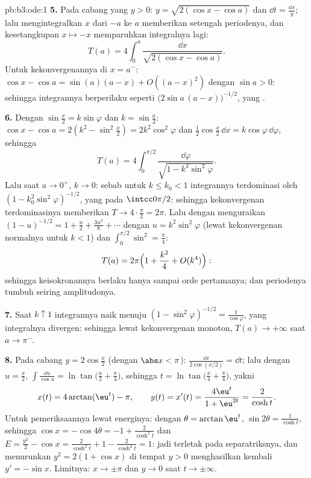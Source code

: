 \begin{solution}{pb:b3:ode:1}
\textbf{5.} Pada cabang yang $y > 0$: $y = \sqrt{2(\cos x
- \cos a)}$ dan $\dd t = \frac{\dd x}{y}$; lalu mengintegralkan $x$
dari $-a$ ke $a$ memberikan setengah periodenya, dan kesetangkupan $x
\mapsto -x$ memparuhkan integralnya lagi:
\[
T(a) = 4\int_0^a\frac{\dd x}{\sqrt{2(\cos x - \cos a)}} .
\]
Untuk kekonvergenannya di $x = a^-$: $\cos x - \cos a = \sin(a)(a - x) +
O((a-x)^2)$ dengan $\sin a > 0$: sehingga integrannya berperilaku seperti
$\bigl(2\sin a\,(a - x)\bigr)^{-1/2}$, yang .

\textbf{6.} Dengan $\sin\frac x2 = k\sin\varphi$ dan $k =
\sin\frac a2$: $\cos x - \cos a = 2(k^2 - \sin^2\frac x2)
= 2k^2\cos^2\varphi$ dan $\frac12\cos\frac x2\,\dd x =
k\cos\varphi\,\dd\varphi$, sehingga
\[
T(a) = 4\int_0^{\pi/2}
\frac{\dd\varphi}{\sqrt{1 - k^2\sin^2\varphi}} .
\]
Lalu saat $a \to 0^+$, $k \to 0$: sebab untuk $k \leq k_0 < 1$
integrannya terdominasi oleh $(1 - k_0^2\sin^2\varphi)^{-1/2}$,
yang  pada $\intcc0{\pi/2}$: sehingga kekonvergenan terdominasinya memberikan $T \to
4\cdot\frac\pi2 = 2\pi$. Lalu dengan menguraikan $(1 - u)^{-1/2} = 1 +
\frac u2 + \frac{3u^2}8 + \cdots$ dengan $u =
k^2\sin^2\varphi$ (lewat kekonvergenan normalnya untuk $k < 1$) dan
$\int_0^{\pi/2}\sin^2 = \frac\pi4$:
\[
T(a) = 2\pi\Bigl(1 + \frac{k^2}{4} + O(k^4)\Bigr) :
\]
sehingga keisokronannya berlaku hanya sampai orde pertamanya; dan periodenya tumbuh seiring
amplitudonya.

\textbf{7.} Saat $k \uparrow 1$ integrannya naik menuju $(1
- \sin^2\varphi)^{-1/2} = \frac1{\cos\varphi}$, yang
integralnya divergen: sehingga lewat kekonvergenan monoton, $T(a) \to
+\infty$ saat $a \to \pi^-$.

\textbf{8.} Pada cabang $y = 2\cos\frac x2$ (dengan $\abs x <
\pi$): $\frac{\dd x}{2\cos(x/2)} = \dd t$; lalu dengan $u = \frac
x2$, $\int\frac{\dd u}{\cos u} =
\ln\tan\bigl(\frac u2 + \frac\pi4\bigr)$, sehingga $t =
\ln\tan\bigl(\frac x4 + \frac\pi4\bigr)$, yakni
\[
x(t) = 4\arctan(\eu^t) - \pi,
\qquad y(t) = x'(t) = \frac{4\eu^t}{1 + \eu^{2t}} =
\frac{2}{\cosh t} .
\]
Untuk pemeriksaannya lewat energinya: dengan $\theta = \arctan\eu^t$,
$\sin2\theta = \frac1{\cosh t}$, sehingga $\cos x = -\cos4\theta =
-1 + \frac{2}{\cosh^2t}$ dan $E = \frac{y^2}2 - \cos x =
\frac2{\cosh^2t} + 1 - \frac2{\cosh^2t} = 1$: jadi 
terletak pada separatriksnya, dan menurunkan $y^2 = 2(1 +
\cos x)$ di tempat $y > 0$ menghasilkan kembali $y' = -\sin x$. Limitnya: $x
\to \pm\pi$ dan $y \to 0$ saat $t \to \pm\infty$.


\end{solution}
